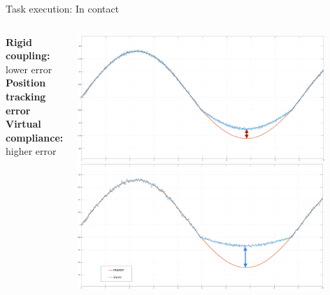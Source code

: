 \documentclass[10pt]{beamer}
\begin{document}
\begin{frame}{Task execution: In contact}
  \smallskip
  \begin{columns}
    \color{Orange}\textbf{Rigid coupling:}\\
    lower error \\
    \bigskip
    \bigskip
    \bigskip
    \color{black}\textbf{Position tracking error }\\
    \bigskip
    \bigskip
    \bigskip
    \color{LightBlue}\textbf{Virtual compliance:}\\
    higher error

    \includegraphics[width=\textwidth,
    height=0.43\textwidth]{../reportTeleop/Images/rigidContactReacPosArrow}
    \smallskip
    \includegraphics[width=\textwidth,
    height=0.43\textwidth]{../reportTeleop/Images/setPointContactReacPosArrow}\\

 \end{columns}
\end{frame}
\end{document}
